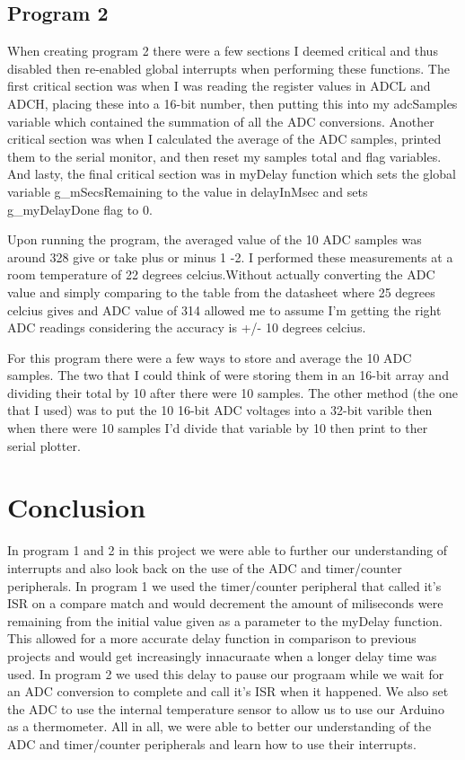 \documentclass[11pt,pdftex,portrait,letterpaper]{article}
\begin{document}
	\pagebreak
	\subsection{Program 2}
	
	When creating program 2 there were a few sections I deemed critical and thus disabled then re-enabled global interrupts when performing these functions. The first critical section was when I was reading the register values in ADCL and ADCH, placing these into a 16-bit number, then putting this into my adcSamples variable which contained the summation of all the ADC conversions. Another critical section was when I calculated the average of the ADC samples, printed them to the serial monitor, and then reset my samples total and flag variables. And lasty, the final critical section was in myDelay function which sets the global variable g\_mSecsRemaining to the value in delayInMsec and sets g\_myDelayDone flag to 0.
	
	Upon running the program, the averaged value of the 10 ADC samples was around 328 give or take plus or minus 1 -2. I performed these measurements at a room temperature of 22 degrees celcius.Without actually converting the ADC value and simply comparing to the table from the datasheet where 25 degrees celcius gives and ADC value of 314 allowed me to assume I'm getting the right ADC readings considering the accuracy is +/- 10 degrees celcius.
	
	For this program there were a few ways to store and average the 10 ADC samples. The two that I could think of were storing them in an 16-bit array and dividing their total by 10 after there were 10 samples. The other method (the one that I used) was to put the 10 16-bit ADC voltages into a 32-bit varible then when there were 10 samples I'd divide that variable by 10 then print to ther serial plotter.
	
	
	
	
	\section{Conclusion}
	
	In program 1 and 2 in this project we were able to further our understanding of interrupts and also look back on the use of the ADC and timer/counter peripherals. In program 1 we used the timer/counter peripheral that called it's ISR on a compare match and would decrement the amount of miliseconds were remaining from the initial value given as a parameter to the myDelay function. This allowed for a more accurate delay function in comparison to previous projects and would get increasingly innacuraate when a longer delay time was used. In program 2 we used this delay to pause our prograam while we wait for an ADC conversion to complete and call it's ISR when it happened. We also set the ADC to use the internal temperature sensor to allow us to use our Arduino as a thermometer. All in all, we were able to better our understanding of the ADC and timer/counter peripherals and learn how to use their interrupts.
	
\end{document}
